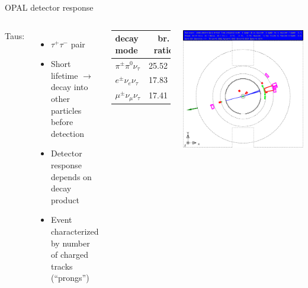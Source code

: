 \documentclass[11pt,xcolor=dvipsnames,professionalfonts]{beamer}
\begin{document}
\begin{frame}{OPAL detector response}
	\begin{columns}
		Taus:
		\begin{itemize}
			\setlength\itemsep{.5em}
			\item $\tau^+\tau^-$ pair
			\item Short lifetime $\rightarrow$ decay into other particles before detection
			\item Detector response depends on decay product
			\item Event characterized by number of charged tracks (``prongs'')
		\end{itemize}
		\centering
		\begin{tabular}{lc}
			\toprule
			decay mode & br. ratio \\
			\midrule
			$\pi^\pm\pi^0\nu_\tau$ & \SI{25.52}{\percent} \\
			$e^\pm\nu_e\nu_\tau$ & \SI{17.83}{\percent} \\
			$\mu^\pm\nu_\mu\nu_\tau$ & \SI{17.41}{\percent} \\
			\bottomrule
		\end{tabular}
		\includegraphics[width=1.0\textwidth]{./talkfigs/pdf/tt_05.pdf}
	\end{columns}
\end{frame}
\end{document}
